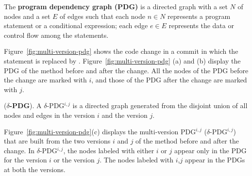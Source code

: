 \begin{Definition}
The \textbf{program dependency graph (PDG)} is a directed graph with
a set $N$ of nodes and a set $E$ of edges such that each node $n \in N$
represents a program statement or a conditional expression; each edge
$e \in E$ represents the data or control flow among the statements.
\end{Definition}

Figure~\ref{fig:multi-version-pdg} shows the code change in a commit
in which the statement  is replaced by
. Figure~\ref{fig:multi-version-pdg} (a) and
(b) display the PDG of the method  before and after
the change. All the nodes of the PDG before the change are marked with
$i$, and those of the PDG after the change are marked with $j$.


\begin{Definition} ({\bf $\delta$-PDG}).
A $\delta$-PDG$^{i,j}$ is a directed graph generated from the disjoint
union of all nodes and edges in the version $i$ and the version $j$.
%
\end{Definition}

Figure~\ref{fig:multi-version-pdg}(c) displays the multi-version
PDG$^{i,j}$ ($\delta$-PDG$^{i,j}$) that are built from the two
versions $i$ and $j$ of the method  before and after
the change. In $\delta$-PDG$^{i,j}$, the nodes labeled with either $i$
or $j$ appear only in the PDG for the version $i$ or the version $j$.
The nodes labeled with $i$,$j$ appear in the PDGs at both the
versions.



